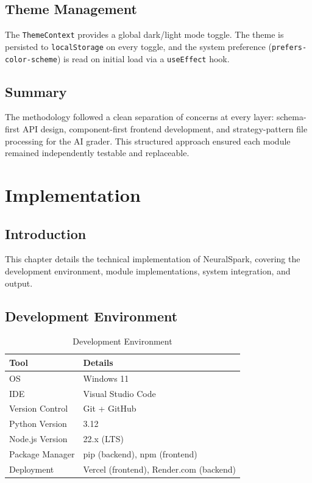 \documentclass[12pt,a4paper]{report}
\begin{document}
\section{Theme Management}
The \texttt{ThemeContext} provides a global dark/light mode toggle. The theme is persisted to
\texttt{localStorage} on every toggle, and the system preference (\texttt{prefers-color-scheme})
is read on initial load via a \texttt{useEffect} hook.

\section{Summary}
The methodology followed a clean separation of concerns at every layer: schema-first API design,
component-first frontend development, and strategy-pattern file processing for the AI grader.
This structured approach ensured each module remained independently testable and replaceable.

\chapter{Implementation}

\section{Introduction}
This chapter details the technical implementation of NeuralSpark, covering the development
environment, module implementations, system integration, and output.

\section{Development Environment}

\begin{table}[h]
\centering
\begin{tabular}{@{}ll@{}}
\toprule
\textbf{Tool} & \textbf{Details} \\
\midrule
OS & Windows 11 \\
IDE & Visual Studio Code \\
Version Control & Git + GitHub \\
Python Version & 3.12 \\
Node.js Version & 22.x (LTS) \\
Package Manager & pip (backend), npm (frontend) \\
Deployment & Vercel (frontend), Render.com (backend) \\
\bottomrule
\end{tabular}
\caption{Development Environment}
\label{tab:devenv}
\end{table}
\end{document}
